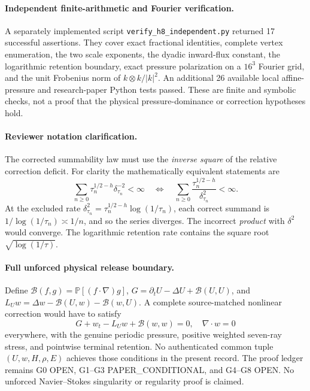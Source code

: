\paragraph{Independent finite-arithmetic and Fourier verification.}
A separately implemented script \texttt{verify\_h8\_independent.py} returned 17 successful assertions. They cover exact fractional identities, complete vertex enumeration, the two scale exponents, the dyadic inward-flux constant, the logarithmic retention boundary, exact pressure polarization on a $16^3$ Fourier grid, and the unit Frobenius norm of $k\otimes k/|k|^2$. An additional 26 available local affine-pressure and research-paper Python tests passed. These are finite and symbolic checks, not a proof that the physical pressure-dominance or correction hypotheses hold.

\paragraph{Reviewer notation clarification.}
The corrected summability law must use the \emph{inverse square} of the relative correction deficit. For clarity the mathematically equivalent statements are
\[
\boxed{\sum_{n\ge0}\tau_n^{1/2-h}\delta_{\tau_n}^{-2}<\infty
\quad\Longleftrightarrow\quad
\sum_{n\ge0}\frac{\tau_n^{1/2-h}}{\delta_{\tau_n}^{2}}<\infty.}
\]
At the excluded rate $\delta_{\tau_n}^2=\tau_n^{1/2-h}\log(1/\tau_n)$, each correct summand is $1/\log(1/\tau_n)\asymp1/n$, and so the series diverges. The incorrect \emph{product} with $\delta^2$ would converge. The logarithmic retention rate contains the square root $\sqrt{\log(1/\tau)}$.

\paragraph{Full unforced physical release boundary.}
Define $\mathcal B(f,g)=\mathbb P[(f\cdot\nabla)g]$, $G=\partial_tU-\Delta U+\mathcal B(U,U)$, and $L_Uw=\Delta w-\mathcal B(U,w)-\mathcal B(w,U)$. A complete source-matched nonlinear correction would have to satisfy
\[
\boxed{G+w_t-L_Uw+\mathcal B(w,w)=0,\quad\nabla\cdot w=0}
\]
everywhere, with the genuine periodic pressure, positive weighted seven-ray stress, and pointwise terminal retention. No authenticated common tuple $(U,w,H,\rho,E)$ achieves those conditions in the present record. The proof ledger remains G0 OPEN, G1--G3 PAPER\_CONDITIONAL, and G4--G8 OPEN. No unforced Navier--Stokes singularity or regularity proof is claimed.
